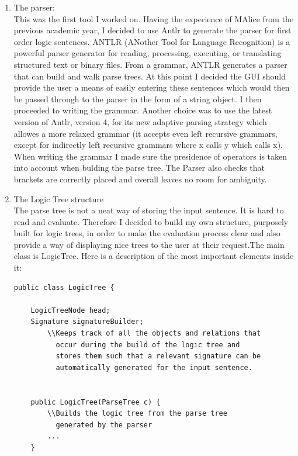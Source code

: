 \documentclass{article}
\begin{document}
	\begin{enumerate}
	\item The parser: \\
This was the first tool I worked on. Having the experience of MAlice from the previous academic year, I decided to use Antlr to generate the parser for first order logic sentences. ANTLR (ANother Tool for Language Recognition) is a powerful parser generator for reading, processing, executing, or translating structured text or binary files. From a grammar, ANTLR generates a parser that can build and walk parse trees. At this point I decided the GUI should provide the user a means of easily entering these sentences which would then be passed through to the parser in the form of a string object. I then proceeded to writing the grammar. Another choice was to use the latest version of Antlr, version 4, for its new adaptive parsing strategy which allowes a more relaxed grammar (it accepts even left recursive grammars, except for indirectly left recursive grammars where x calls y which calls x). When writing the grammar I made sure the presidence of operators is taken into account when bulding the parse tree. The Parser also checks that brackets are correctly placed and overall leaves no room for ambiguity. 

	\item The Logic Tree structure \\
The parse tree is not a neat way of storing the input sentence. It is hard to read and evaluate. Therefore I decided to build my own structure, purposely built for logic trees, in order to make the evaluation process clear and also provide a way of displaying nice trees to the user at their request.The main class is LogicTree. Here is a description of the most important elements inside it:\\

\begin{verbatim}
public class LogicTree {

    LogicTreeNode head;					
    Signature signatureBuilder;
        \\Keeps track of all the objects and relations that
          occur during the build of the logic tree and
          stores them such that a relevant signature can be
          automatically generated for the input sentence.


    public LogicTree(ParseTree c) {  
        \\Builds the logic tree from the parse tree
          generated by the parser
	    ...
	}


\end{verbatim}
\end{enumerate}
\end{document}
